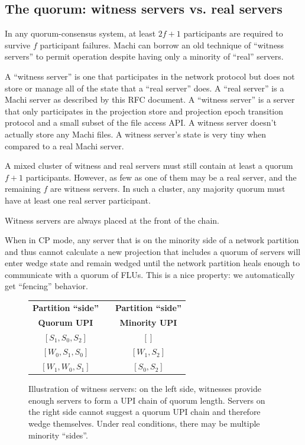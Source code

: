 \documentclass[preprint,10pt]{sigplanconf}
\begin{document}
\subsection{The quorum: witness servers vs. real servers}

In any quorum-consensus system, at least $2f+1$ participants are
required to survive $f$ participant failures.  Machi can borrow an
old technique of ``witness servers'' to permit operation despite
having only a minority of ``real'' servers.

A ``witness server'' is one that participates in the network protocol
but does not store or manage all of the state that a ``real server''
does.  A ``real server'' is a Machi server as
described by this RFC document.  A ``witness server'' is a server that
only participates in the projection store and projection epoch
transition protocol and a small subset of the file access API.
A witness server doesn't actually store any
Machi files.  A witness server's state is very tiny when compared to a
real Machi server.

A mixed cluster of witness and real servers must still contain at
least a quorum $f+1$ participants.  However, as few as one of them
may be a real server,
and the remaining $f$ are witness servers.  In
such a cluster, any majority quorum must have at least one real server
participant.

Witness servers are always placed at the front of the chain.

When in CP mode, any server that is on the minority side of a network
partition and thus cannot calculate a new projection that includes a
quorum of servers will
enter wedge state and remain wedged until the network partition
heals enough to communicate with a quorum of FLUs.  This is a nice
property: we automatically get ``fencing'' behavior.

\begin{figure}
\centering
\begin{tabular}{c|c|c}
{\bf {{Partition ``side''}}} & & {\bf Partition ``side''} \\
{\bf {{Quorum UPI}}} && {\bf Minority UPI} \\
\hline
$[S_1,S_0,S_2]$ && $[]$ \\

$[W_0,S_1,S_0]$ && $[W_1,S_2]$ \\

$[W_1,W_0,S_1]$ && $[S_0,S_2]$ \\

\end{tabular}
\caption{Illustration of witness servers: on the left side, witnesses
  provide enough servers to form a UPI chain of quorum length. Servers
on the right side cannot suggest a quorum UPI chain and therefore
wedge themselves.  Under real conditions, there may be multiple
minority ``sides''.}
\label{tab:witness-examples}
\end{figure}
\end{document}

